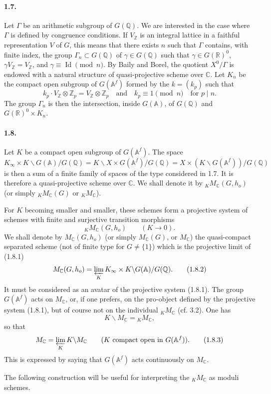 \documentclass[10pt]{article}
\newcommand{\A}{\mathbb A}
\newcommand{\Af}{\mathbb A^f}
\newcommand{\C}{\mathbb C}
\newcommand{\Q}{\mathbb Q}
\newcommand{\R}{\mathbb R}
\newcommand{\Z}{\mathbb Z}
\newcommand{\id}{\operatorname{Id}}
\newcommand{\limproj}{\varprojlim}
\newcommand{\MC}{M_{\C}}
\begin{document}
\paragraph{1.7.} Let $\Gamma$ be an arithmetic subgroup of $G(\Q)$. We are interested in the case where $\Gamma$ is defined by congruence conditions. If $V_\Z$ is an integral lattice in a faithful representation $V$ of $G$, this means that there exists $n$ such that $\Gamma$ contains, with finite index, the group $\Gamma_n\subset G(\Q)$ of $\gamma\in G(\Q)$ such that $\gamma\in G(\R)^0$, $\gamma V_\Z=V_\Z$, and $\gamma\equiv\id\pmod n$. By Baily and Borel, the quotient $X^0/\Gamma$ is endowed with a natural structure of quasi-projective scheme over $\C$. Let $K_n$ be the compact open subgroup of $G(\Af)$ formed by the $k=(k_p)$ such that
\[
k_p\cdot V_\Z\otimes\Z_p=V_\Z\otimes\Z_p
\quad\text{and}\quad
k_p\equiv1\pmod n\quad\text{for }p\mid n.
\]
The group $\Gamma_n$ is then the intersection, inside $G(\A)$, of $G(\Q)$ and $G(\R)^0\times K_n$.

\paragraph{1.8.} Let $K$ be a compact open subgroup of $G(\Af)$. The space
\[
K_\infty\times K\backslash G(\A)/G(\Q)
=K\backslash X\times G(\Af)/G(\Q)
=X\times(K\backslash G(\Af))/G(\Q)
\]
is then a sum of a finite family of spaces of the type considered in 1.7. It is therefore a quasi-projective scheme over $\C$. We shall denote it by ${}_K\MC(G,h_o)$ (or simply ${}_K\MC(G)$ or ${}_K\MC$).

For $K$ becoming smaller and smaller, these schemes form a projective system of schemes with finite and surjective transition morphisms
\[
{}_K\MC(G,h_o)\qquad(K\to0). \tag{1.8.1}
\]
We shall denote by $\MC(G,h_o)$ (or simply $\MC(G)$, or $\MC$) the quasi-compact separated scheme (not of finite type for $G\ne\{1\}$) which is the projective limit of (1.8.1)
\[
\MC(G,h_o)=\limproj_K K_\infty\times K\backslash G(\A)/G(\Q). \tag{1.8.2}
\]
It must be considered as an avatar of the projective system (1.8.1). The group $G(\Af)$ acts on $\MC$, or, if one prefers, on the pro-object defined by the projective system (1.8.1), but of course not on the individual ${}_K\MC$ (cf. 3.2). One has
\[
K\backslash\MC={}_K\MC,
\]
so that
\[
\MC=\limproj_K K\backslash\MC\qquad(K\text{ compact open in }G(\Af)). \tag{1.8.3}
\]
This is expressed by saying that $G(\Af)$ acts continuously on $\MC$.

The following construction will be useful for interpreting the ${}_K\MC$ as moduli schemes.
\end{document}
